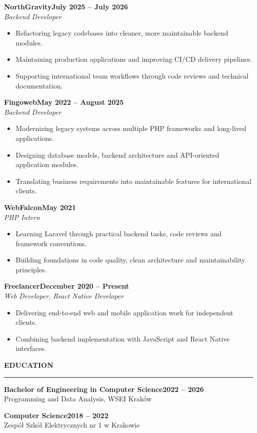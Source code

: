 \documentclass[10pt,a4paper]{article}
\newcommand{\pagetopsectiontitle}[1]{%
  \vspace{4pt}%
  {\large\bfseries\MakeUppercase{#1}}\\[-2pt]%
  {\color{cvolive}\hrule}%
  \vspace{4pt}%
}
\newcommand{\roleentry}[4]{%
  \textbf{#1}\hfill{\small\textbf{\textcolor{cvolive}{#2}}}\\
  \textit{#3}\\[-5pt]
  #4
  \vspace{0pt}
}
\begin{document}
\roleentry{NorthGravity}{July 2025 -- July 2026}{Backend Developer}{
\begin{itemize}
  \item Refactoring legacy codebases into cleaner, more maintainable backend modules.
  \item Maintaining production applications and improving CI/CD delivery pipelines.
  \item Supporting international team workflows through code reviews and technical documentation.
\end{itemize}}

\roleentry{Fingoweb}{May 2022 -- August 2025}{Backend Developer}{
\begin{itemize}
  \item Modernizing legacy systems across multiple PHP frameworks and long-lived applications.
  \item Designing database models, backend architecture and API-oriented application modules.
  \item Translating business requirements into maintainable features for international clients.
\end{itemize}}

\roleentry{WebFalcon}{May 2021}{PHP Intern}{
\begin{itemize}
  \item Learning Laravel through practical backend tasks, code reviews and framework conventions.
  \item Building foundations in code quality, clean architecture and maintainability principles.
\end{itemize}}

\roleentry{Freelancer}{December 2020 -- Present}{Web Developer, React Native Developer}{
\begin{itemize}
  \item Delivering end-to-end web and mobile application work for independent clients.
  \item Combining backend implementation with JavaScript and React Native interfaces.
\end{itemize}}

\newpage

\pagetopsectiontitle{Education}
\textbf{Bachelor of Engineering in Computer Science}\hfill{\small\textbf{\textcolor{cvolive}{2022 -- 2026}}}\\
Programming and Data Analysis, WSEI Kraków

\vspace{5pt}
\textbf{Computer Science}\hfill{\small\textbf{\textcolor{cvolive}{2018 -- 2022}}}\\
Zespół Szkół Elektrycznych nr 1 w Krakowie
\end{document}
